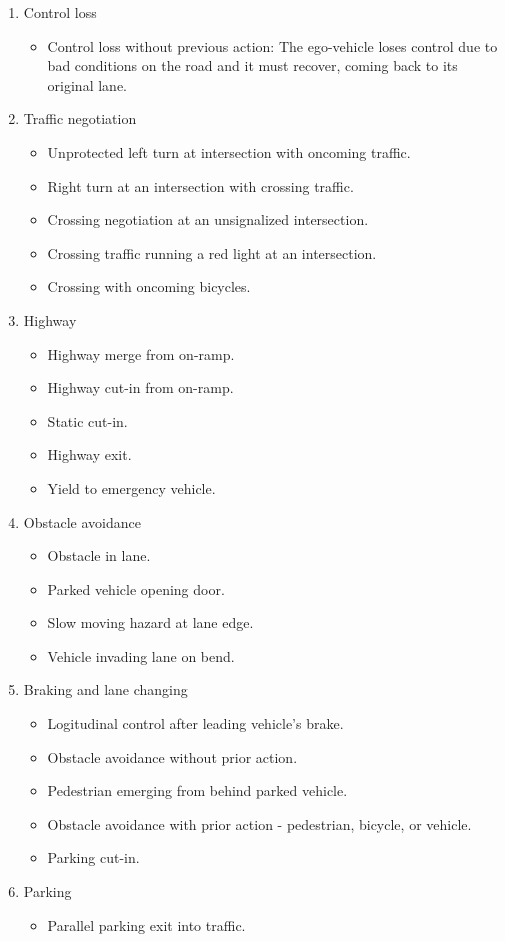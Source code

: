 \documentclass[a4paper]{article}
\begin{document}
\begin{enumerate}
  \item Control loss \begin{itemize}
    \item Control loss without previous action: The ego-vehicle loses control due to bad conditions on the road and it must recover, coming back to its original lane. 
  \end{itemize}
  \item   Traffic negotiation \begin{itemize}
    \item Unprotected left turn at intersection with oncoming traffic.
    \item Right turn at an intersection with crossing traffic.
    \item Crossing negotiation at an unsignalized intersection.
    \item Crossing traffic running a red light at an intersection.
    \item Crossing with oncoming bicycles.
  \end{itemize}
  \item Highway \begin{itemize}
    \item Highway merge from on-ramp.
    \item Highway cut-in from on-ramp.
    \item Static cut-in.
    \item Highway exit.
    \item Yield to emergency vehicle.
  \end{itemize}
  \item Obstacle avoidance \begin{itemize}
    \item Obstacle in lane.
    \item Parked vehicle opening door.
    \item Slow moving hazard at lane edge.
    \item Vehicle invading lane on bend.
  \end{itemize}
  \item Braking and lane changing \begin{itemize}
    \item Logitudinal control after leading vehicle's brake.
    \item Obstacle avoidance without prior action.
    \item Pedestrian emerging from behind parked vehicle.
    \item Obstacle avoidance with prior action - pedestrian, bicycle, or vehicle.
    \item Parking cut-in.
  \end{itemize}
  \item Parking \begin{itemize}
    \item Parallel parking exit into traffic.
  \end{itemize}
\end{enumerate}
\end{document}
